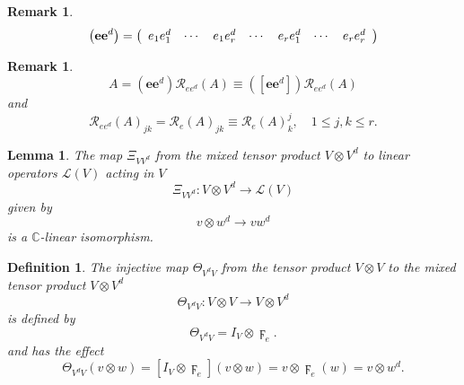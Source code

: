 \documentclass[aps,preprint]{revtex4}%
\newtheorem{definition}[theorem]{Definition}
\newtheorem{lemma}[theorem]{Lemma}
\newtheorem{remark}[theorem]{Remark}
\begin{document}
\begin{remark}%
\begin{equation}
\left(  \mathbf{ee}^{d}\right)  =\left(
\begin{array}
[c]{ccccccc}%
e_{1}e_{1}^{d} & \cdots & e_{1}e_{r}^{d} & \cdots & e_{r}e_{1}^{d} & \cdots &
e_{r}e_{r}^{d}%
\end{array}
\right)
\end{equation}

\end{remark}

\begin{remark}%
\begin{equation}
A=\left(  \mathbf{ee}^{d}\right)  \mathcal{R}_{ee^{d}}\left(  A\right)
\equiv\left(  \left[  \mathbf{ee}^{d}\right]  \right)  \mathcal{R}_{ee^{d}%
}\left(  A\right)
\end{equation}
and
\begin{equation}
\mathcal{R}_{ee^{d}}\left(  A\right)  _{jk}=\mathcal{R}_{e}\left(  A\right)
_{jk}\equiv\mathcal{R}_{e}\left(  A\right)  _{k}^{j},\quad1\leq j,k\leq r.
\end{equation}

\end{remark}

\begin{lemma}
The map $\Xi_{VV^{d}}$ from the mixed tensor product $V\otimes V^{d}$ to
linear operators $\mathcal{L}\left(  V\right)  $ acting in $V$
\begin{equation}
\Xi_{VV^{d}}:V\otimes V^{d}\rightarrow\mathcal{L}\left(  V\right)
\end{equation}
given by
\begin{equation}
v\otimes w^{d}\rightarrow vw^{d}%
\end{equation}
is a $\mathbb{C}$-linear isomorphism.
\end{lemma}

\begin{definition}
The injective map $\Theta_{V^{d}V}$ from the tensor product $V\otimes V$ to
the mixed tensor product $V\otimes V^{d}$
\begin{equation}
\Theta_{V^{d}V}:V\otimes V\rightarrow V\otimes V^{d}%
\end{equation}
is defined by
\begin{equation}
\Theta_{V^{d}V}=I_{V}\otimes\digamma_{e}.
\end{equation}
and has the effect
\begin{equation}
\Theta_{V^{d}V}\left(  v\otimes w\right)  =\left[  I_{V}\otimes\digamma
_{e}\right]  \left(  v\otimes w\right)  =v\otimes\digamma_{e}\left(  w\right)
=v\otimes w^{d}.
\end{equation}

\end{definition}
\end{document}
